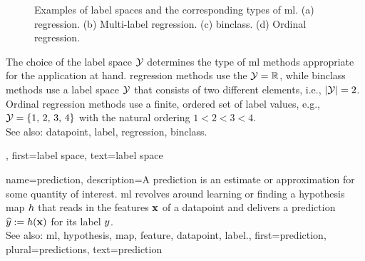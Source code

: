{{\begin{figure}[H]
		\caption{\label{fig_label_spaces_dict} Examples of \gls{label} spaces and the corresponding types of \gls{ml}.
			(a) \Gls{regression}. (b) Multi-label \gls{regression}. (c) \Gls{binclass}. (d) Ordinal \gls{regression}.}
		\end{figure}
		The choice of the \gls{label} space $\mathcal{Y}$ determines the type of \gls{ml} methods 
		appropriate for the application at hand. \Gls{regression} methods use the $\mathcal{Y} = \mathbb{R}$, 
		while \gls{binclass} methods use a \gls{label} space $\mathcal{Y}$ that consists of two different 
		elements, i.e., $|\mathcal{Y}|=2$. Ordinal \gls{regression} methods use a finite, ordered set of 
		\gls{label} values, e.g., $\mathcal{Y} = \{1,\,2,\,3,\,4\}$ with the natural ordering $1 < 2 < 3 < 4$. 
					\\ 
		See also:  \gls{datapoint}, \gls{label}, \gls{regression}, \gls{binclass}.}, 
	first={label space},
	text={label space}  
}

{name={prediction},
	description={A prediction is an estimate or approximation for some 
		quantity of interest. \Gls{ml} revolves around learning or finding a \gls{hypothesis} \gls{map} $h$ 
		that reads in the \glspl{feature} ${\bf x}$ of a \gls{datapoint} and delivers a prediction 
		$\widehat{y} := h({\bf x})$ for its \gls{label} $y$.
					\\ 
		See also: \gls{ml}, \gls{hypothesis}, \gls{map}, \gls{feature}, \gls{datapoint}, \gls{label}.},
	first={prediction},
	plural={predictions},
	text={prediction}  
}

